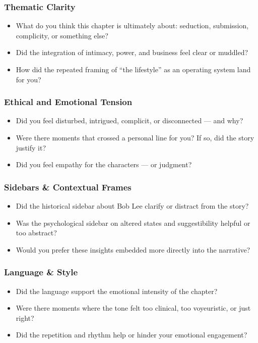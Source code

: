 \subsubsection{Thematic Clarity}

\begin{itemize}
  \item What do you think this chapter is ultimately about: seduction, submission, complicity, or something else?
  \item Did the integration of intimacy, power, and business feel clear or muddled?
  \item How did the repeated framing of “the lifestyle” as an operating system land for you?
\end{itemize}

\subsubsection{Ethical and Emotional Tension}

\begin{itemize}
  \item Did you feel disturbed, intrigued, complicit, or disconnected — and why?
  \item Were there moments that crossed a personal line for you? If so, did the story justify it?
  \item Did you feel empathy for the characters — or judgment?
\end{itemize}

\subsubsection{Sidebars \& Contextual Frames}

\begin{itemize}
  \item Did the historical sidebar about Bob Lee clarify or distract from the story?
  \item Was the psychological sidebar on altered states and suggestibility helpful or too abstract?
  \item Would you prefer these insights embedded more directly into the narrative?
\end{itemize}

\subsubsection{Language \& Style}

\begin{itemize}
  \item Did the language support the emotional intensity of the chapter?
  \item Were there moments where the tone felt too clinical, too voyeuristic, or just right?
  \item Did the repetition and rhythm help or hinder your emotional engagement?
\end{itemize}


